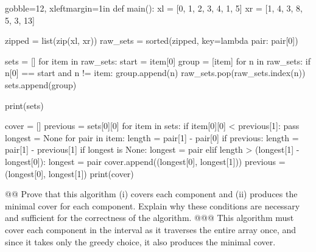 \documentclass[10pt]{article}
\begin{document}
\begin{easylist}[enumerate]
        \begin{pythoncode*}{gobble=12, xleftmargin=1in}
            def main():
                xl = [0, 1, 2, 3, 4, 1, 5]
                xr = [1, 4, 3, 8, 5, 3, 13]

                zipped = list(zip(xl, xr))
                raw_sets = sorted(zipped, key=lambda pair: pair[0])

                sets = []
                for item in raw_sets:
                    start = item[0]
                    group = [item]
                    for n in raw_sets:
                        if n[0] == start and n != item:
                            group.append(n)
                            raw_sets.pop(raw_sets.index(n))
                    sets.append(group)

                print(sets)

                cover = []
                previous = sets[0][0]
                for item in sets:
                    if item[0][0] < previous[1]:
                        pass
                    longest = None
                    for pair in item:
                        length = pair[1] - pair[0]
                        if previous:
                            length = pair[1] - previous[1]
                        if longest is None:
                            longest = pair
                        elif length > (longest[1] - longest[0]):
                            longest = pair
                    cover.append((longest[0], longest[1]))
                    previous = (longest[0], longest[1])
                print(cover)
        \end{pythoncode*}

    @@ Prove that this algorithm (i) covers each component and (ii) produces the minimal cover for each component.
    Explain why these conditions are necessary and sufficient for the correctness of the algorithm.
    @@@ This algorithm must cover each component in the interval as it traverses the entire array once, and since it
    takes only the greedy choice, it also produces the minimal cover.
\end{easylist}
\end{document}
